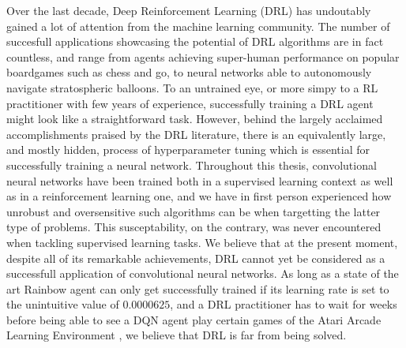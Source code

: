 Over the last decade, Deep Reinforcement Learning (DRL) has undoutably gained a lot of attention from the machine learning community. The number of succesfull applications showcasing the potential of DRL algorithms are in fact countless, and range from agents achieving super-human performance on popular boardgames such as chess and go, to neural networks able to autonomously navigate stratospheric balloons. To an untrained eye, or more simpy to a RL practitioner with few years of experience, successfully training a DRL agent might look like a straightforward task. However, behind the largely acclaimed accomplishments praised by the DRL literature, there is an equivalently large, and mostly hidden, process of hyperparameter tuning which is essential for successfully training a neural network. Throughout this thesis, convolutional neural networks have been trained both in a supervised learning context as well as in a reinforcement learning one, and we have in first person experienced how unrobust and oversensitive such algorithms can be when targetting the latter type of problems. This susceptability, on the contrary, was never encountered when tackling supervised learning tasks. We believe that at the present moment, despite all of its remarkable achievements, DRL cannot yet be considered as a successfull application of convolutional neural networks. As long as a state of the art Rainbow agent \cite{hessel2018rainbow} can only get successfully trained if its learning rate is set to the unintuitive value of $0.0000625$, and a DRL practitioner has to wait for weeks before being able to see a DQN agent play certain games of the Atari Arcade Learning Environment \cite{kaiser2019model}, we believe that DRL is far from being solved.


